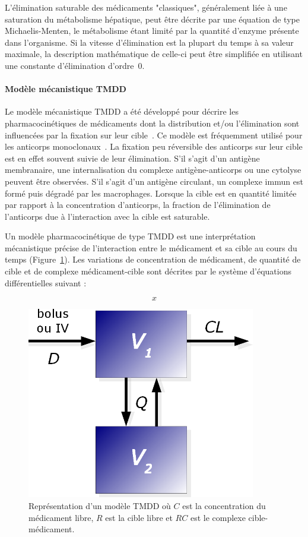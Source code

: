 L'élimination saturable des médicaments "classiques", généralement liée à une saturation du métabolisme hépatique, peut être décrite par une équation de type Michaelis-Menten, le métabolisme étant limité par la quantité d'enzyme présente dans l'organisme. Si la vitesse d'élimination est la plupart du temps à sa valeur maximale, la description mathématique de celle-ci peut être simplifiée en utilisant une constante d'élimination d'ordre~0.
\paragraph{Modèle mécanistique TMDD} Le modèle mécanistique TMDD a été développé pour décrire les pharmacocinétiques de médicaments dont la distribution et/ou l'élimination sont influencées par la fixation sur leur cible~\citep{REF3}. Ce modèle est fréquemment utilisé pour les anticorps monoclonaux~\citep{REF4}. La fixation peu réversible des anticorps sur leur cible est en effet souvent suivie de leur élimination. S'il s'agit d'un antigène membranaire, une internalisation du complexe antigène-anticorps ou une cytolyse peuvent être observées. S'il s'agit d'un antigène circulant, un complexe immun est formé puis dégradé par les macrophages. Lorsque la cible est en quantité limitée par rapport à la concentration d'anticorps, la fraction de l'élimination de l'anticorps due à l'interaction avec la cible est saturable.

Un modèle pharmacocinétique de type TMDD est une interprétation mécanistique précise de l'interaction entre le médicament et sa cible au cours du temps (Figure~\ref{fig:6}). Les variations de concentration de médicament, de quantité de cible et de complexe médicament-cible sont décrites par le système d'équations différentielles suivant :

\begin{equation}
x
\label{eq:33}
\end{equation}

\begin{figure}[htbp]
	\centering
		\includegraphics[width=10cm]{figures/raster/FIG_5}
	\caption[Représentation d'un modèle TMDD]{Représentation d'un modèle TMDD où $C$ est la concentration du médicament libre, $R$ est la cible libre et $RC$ est le complexe cible-médicament.}
	\label{fig:6}
\end{figure}


